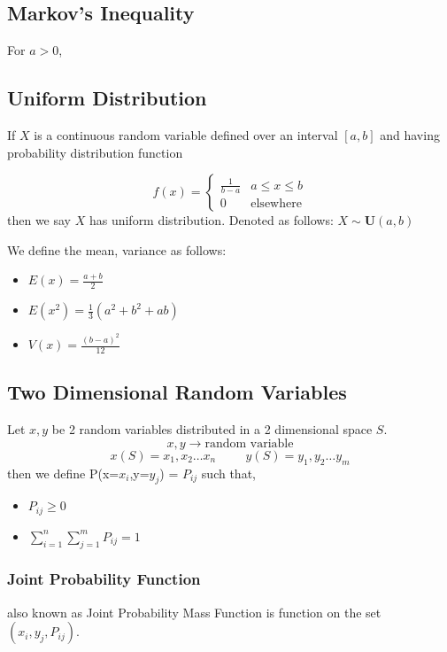 \documentclass[./EngineeringMaths.tex]{subfiles}
\begin{document}
\subsection{Markov's Inequality}
For $a>0$, 
\begin{center}
\end{center}

\subsection{Uniform Distribution}
If $X$ is a continuous random variable defined over an interval $[a,b]$ and having probability distribution function

$$
f(x) = \left\{
    \begin{array}{cr}
        \frac{1}{b-a} & a\leq x \leq b \\
        0 & \mbox{elsewhere}
    \end{array}
\right.
$$
then we say $X$ has uniform distribution. Denoted as follows: $X \sim \mathbf{U}(a,b)  $

We define the mean, variance as follows:
\begin{itemize}
    \item $E(x) = \frac{a+b}{2}$
    \item $E(x^2) = \frac{1}{3}(a^2+b^2+ab)$
    \item $V(x) = \frac{(b-a)^2}{12}$
\end{itemize}

\subsection{Two Dimensional Random Variables}
Let $x,y$ be 2 random variables distributed in a 2 dimensional space $S$.
$$x,y \rightarrow \mbox{random variable}$$
$$x(S) = x_1,x_2\dots x_n \hspace{1cm} y(S) = y_1,y_2\dots y_m$$
then we define P(x=$x_i$,y=$y_j$) = $P_{ij}$ such that,
\begin{itemize}
    \item $P_{ij} \geq 0$
    \item $\sum\limits_{i=1}^n \sum\limits_{j=1}^m P_{ij} = 1 $
\end{itemize}

\subsubsection{Joint Probability Function}
also known as Joint Probability Mass Function is function on the set $(x_i,y_j,P_{ij})$.
\end{document}
